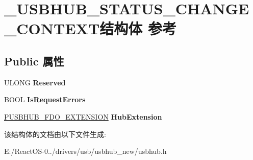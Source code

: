 \hypertarget{struct___u_s_b_h_u_b___s_t_a_t_u_s___c_h_a_n_g_e___c_o_n_t_e_x_t}{}\section{\+\_\+\+U\+S\+B\+H\+U\+B\+\_\+\+S\+T\+A\+T\+U\+S\+\_\+\+C\+H\+A\+N\+G\+E\+\_\+\+C\+O\+N\+T\+E\+X\+T结构体 参考}
\label{struct___u_s_b_h_u_b___s_t_a_t_u_s___c_h_a_n_g_e___c_o_n_t_e_x_t}
\subsection*{Public 属性}
\begin{DoxyCompactItemize}
\item 
\mbox{\label{struct___u_s_b_h_u_b___s_t_a_t_u_s___c_h_a_n_g_e___c_o_n_t_e_x_t_a49193dcde9d7bbf034edfe9c98a8bb81}} 
U\+L\+O\+NG {\bfseries Reserved}
\item 
\mbox{\label{struct___u_s_b_h_u_b___s_t_a_t_u_s___c_h_a_n_g_e___c_o_n_t_e_x_t_a49ce5a1a94a3f1239c2f603bc47b095f}} 
B\+O\+OL {\bfseries Is\+Request\+Errors}
\item 
\mbox{\label{struct___u_s_b_h_u_b___s_t_a_t_u_s___c_h_a_n_g_e___c_o_n_t_e_x_t_ac758a13f498a7fb5d1fa7b72790c326e}} 
\hyperlink{struct___u_s_b_h_u_b___f_d_o___e_x_t_e_n_s_i_o_n}{P\+U\+S\+B\+H\+U\+B\+\_\+\+F\+D\+O\+\_\+\+E\+X\+T\+E\+N\+S\+I\+ON} {\bfseries Hub\+Extension}
\end{DoxyCompactItemize}


该结构体的文档由以下文件生成\+:\begin{DoxyCompactItemize}
\item 
E\+:/\+React\+O\+S-\/0../drivers/usb/usbhub\+\_\+new/usbhub.\+h\end{DoxyCompactItemize}
